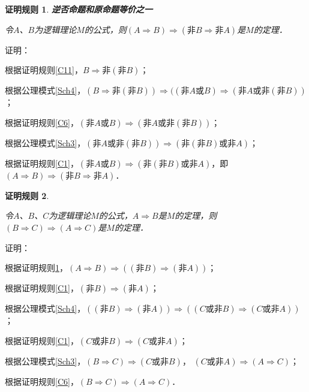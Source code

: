 \documentclass[12pt, a4paper, oneside]{book}
\newtheorem{C}{证明规则}
\begin{document}
			\begin{C}\label{C12}				
				\textbf{逆否命题和原命题等价之一}
				\par
				令$A$、$B$为逻辑理论$M$的公式，则$(A\Rightarrow B)\Rightarrow (\text{非}B\Rightarrow \text{非}A)$是$M$的定理．
			\end{C}
			证明：
			\par
			根据证明规则\ref{C11}，$B\Rightarrow \text{非}(\text{非}B)$；
			\par
			根据公理模式\ref{Sch4}，$(B\Rightarrow \text{非}(\text{非}B))\Rightarrow ((\text{非}A\text{或}B)\Rightarrow (\text{非}A\text{或}\text{非}(\text{非}B))$；
			\par
			根据证明规则\ref{C6}，$(\text{非}A\text{或}B)\Rightarrow (\text{非}A\text{或}\text{非}(\text{非}B))$；
			\par
			根据公理模式\ref{Sch3}，$(\text{非}A\text{或}\text{非}(\text{非}B))\Rightarrow (\text{非}(\text{非}B)\text{或}\text{非}A)$；
			\par
			根据证明规则\ref{C1}，$(\text{非}A\text{或}B)\Rightarrow (\text{非}(\text{非}B)\text{或}\text{非}A)$，即$(A\Rightarrow B)\Rightarrow (\text{非}B\Rightarrow \text{非}A)$．

			\begin{C}\label{C13}	
				\hfill\par
				令$A$、$B$、$C$为逻辑理论$M$的公式，$A\Rightarrow B$是$M$的定理，则$(B\Rightarrow C)\Rightarrow (A\Rightarrow C)$是$M$的定理．
			\end{C}
			证明：
			\par
			根据证明规则\ref{C12}，$(A\Rightarrow B)\Rightarrow ((\text{非}B)\Rightarrow (\text{非}A))$；
			\par
			根据证明规则\ref{C1}，$(\text{非}B)\Rightarrow (\text{非}A)$；
			\par
			根据公理模式\ref{Sch4}，$((\text{非}B)\Rightarrow (\text{非}A))\Rightarrow ((C\text{或}\text{非}B)\Rightarrow (C\text{或}\text{非}A))$；
			\par
			根据证明规则\ref{C1}，$(C\text{或}\text{非}B)\Rightarrow (C\text{或}\text{非}A)$；
			\par
			根据公理模式\ref{Sch3}，$(B\Rightarrow C)\Rightarrow (C\text{或}\text{非}B)$，
			$(C\text{或}\text{非}A)\Rightarrow (A\Rightarrow C)$；
			\par
			根据证明规则\ref{C6}，$(B\Rightarrow C)\Rightarrow (A\Rightarrow C)$．
			
\end{document}

